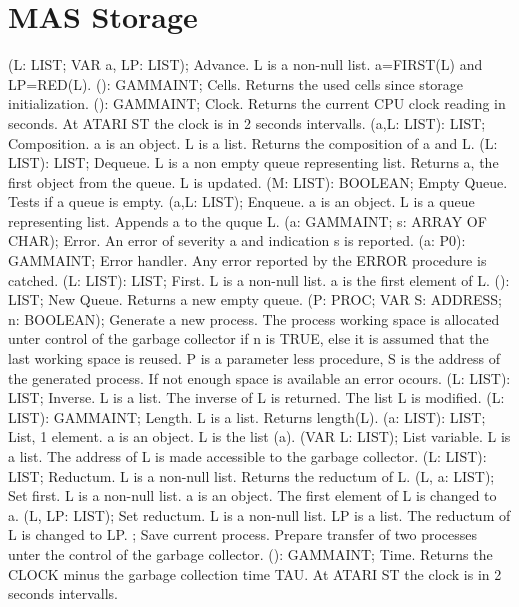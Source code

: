 \section{ MAS Storage  } 
 (L: LIST; VAR a, LP: LIST); \eproc
\bcom Advance. L is a non-null list. a=FIRST(L) and LP=RED(L).  \ecom 
{} (): GAMMAINT; \eproc
\bcom Cells. Returns the used cells since storage initialization.  \ecom 
{} (): GAMMAINT; \eproc
\bcom Clock. Returns the current CPU clock reading in seconds.
At ATARI ST the clock is in 2 seconds intervalls.  \ecom 
{} (a,L: LIST): LIST; \eproc
\bcom Composition. a is an object. L is a list. Returns the
composition of a and L.  \ecom 
{} (L: LIST): LIST; \eproc
\bcom Dequeue. L is a non empty queue representing list. Returns a, the
first object from the queue. L is updated.  \ecom 
{} (M: LIST): BOOLEAN; \eproc
\bcom Empty Queue. Tests if a queue is empty.  \ecom 
{} (a,L: LIST); \eproc
\bcom Enqueue. a is an object. L is a queue representing list. Appends a
to the quque L.  \ecom 
{} (a: GAMMAINT; s: ARRAY OF CHAR); \eproc
\bcom Error. An error of severity a and indication s is reported.  \ecom 
{} (a: P0): GAMMAINT; \eproc
\bcom Error handler. Any error reported by the ERROR procedure is catched.  \ecom 
{} (L: LIST): LIST; \eproc
\bcom First. L is a non-null list. a is the first element of L.  \ecom 
{} (): LIST; \eproc
\bcom New Queue. Returns a new empty queue.  \ecom 
{} (P: PROC; VAR S: ADDRESS; n: BOOLEAN); \eproc
\bcom Generate a new process. The process working space is allocated unter
control of the garbage collector if n is TRUE, else it is assumed that 
the last working space is reused. P is a parameter less procedure,
S is the address of the generated process. If not enough space is 
available an error ocours.  \ecom 
{} (L: LIST): LIST; \eproc
\bcom Inverse. L is a list. The inverse of L is returned. The list L is
modified.  \ecom 
{} (L: LIST): GAMMAINT; \eproc
\bcom Length. L is a list. Returns length(L). \ecom 
{} (a: LIST): LIST; \eproc
\bcom List, 1 element. a is an object. L is the list (a).  \ecom 
{} (VAR L: LIST); \eproc
\bcom List variable. L is a list. The address of L is made accessible
to the garbage collector.  \ecom 
{} (L: LIST): LIST; \eproc
\bcom Reductum. L is a non-null list. Returns the reductum of L.  \ecom 
{} (L, a: LIST); \eproc
\bcom Set first. L is a non-null list. a is an object. The first
element of L is changed to a.  \ecom 
{} (L, LP: LIST); \eproc
\bcom Set reductum. L is a non-null list. LP is a list. The reductum
of L is changed to LP.  \ecom 
{} ; \eproc
\bcom Save current process. Prepare transfer of two processes
unter the control of the garbage collector.  \ecom 
{} (): GAMMAINT; \eproc
\bcom Time. Returns the CLOCK minus the garbage collection time TAU.
At ATARI ST the clock is in 2 seconds intervalls.  \ecom 
